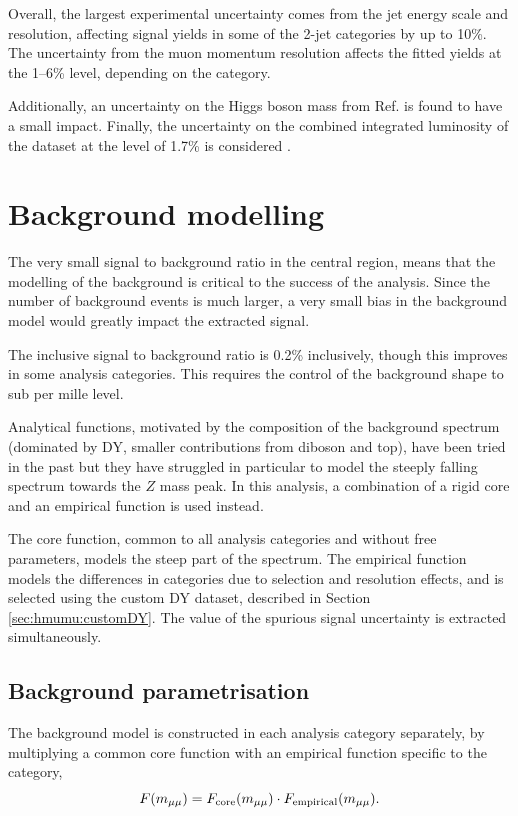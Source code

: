 Overall, the largest experimental uncertainty comes from the
jet energy scale and resolution, affecting signal yields in some
of the 2-jet categories by up to 10\%. The uncertainty from
the muon momentum resolution affects the fitted yields at the
1--6\% level, depending on the category.

Additionally, an uncertainty on the Higgs boson mass from Ref.
\cite{ATL-PHYS-PUB-2018-054, Aad:2015zhl} is found to have a
small impact. Finally, the uncertainty on the combined integrated
luminosity of the dataset at the level of 1.7\% is considered
\cite{ATLAS-CONF-2019-021, Aaboud:2016hhf}.


\section{Background modelling}

The very small signal to background ratio in the central region,
means that the modelling of the background is critical to the
success of the analysis. Since the number of background events
is much larger, a very small bias in the background model would
greatly impact the extracted signal.

The inclusive signal to background ratio is 0.2\% inclusively,
though this improves in some analysis categories. This requires
the control of the background shape to sub per mille level.

Analytical functions, motivated by the composition of the
background spectrum (dominated by DY, smaller contributions
from diboson and top), have been tried in the past but they have
struggled in particular to model the steeply falling spectrum
towards the $Z$ mass peak. In this analysis, a combination
of a rigid core and an empirical function is used instead.

The core function, common to all analysis categories and without
free parameters, models the steep part of the spectrum. The
empirical function models the differences in categories
due to selection and resolution effects, and is selected
using the custom DY dataset, described in Section \ref{sec:hmumu:customDY}.
The value of the spurious signal uncertainty is extracted
simultaneously.

\subsection{Background parametrisation}

The background model is constructed in each analysis category
separately, by multiplying a common core function with an
empirical function specific to the category,
\begin{equation}
\label{eq:hmumu:bkg}
F(m_{\mu\mu}) = F_\text{core}(m_{\mu\mu}) \cdot F_{\text{empirical}}(m_{\mu\mu}).
\end{equation}

